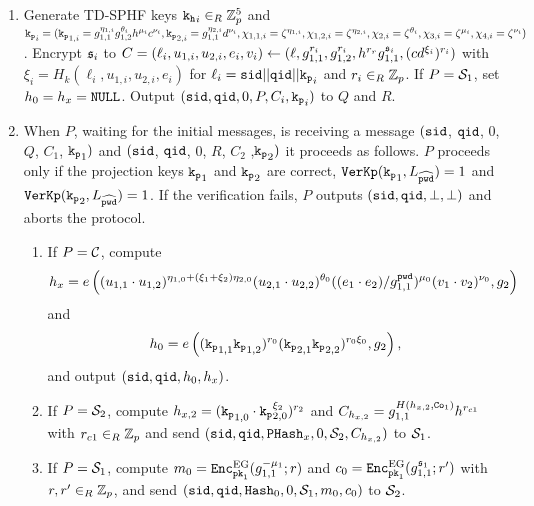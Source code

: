 	
	  \begin{enumerate}
	    \item Generate \ac{TD-SPHF} keys $\mathtt{k_h}_i\in_R\mathbb{Z}_p^{5}$ and 
	      $\mathtt{k_p}_i=(\mathtt{k_p}_{1,i}=g_{1,1}^{\eta_{1,i}} g_{1,2}^{\theta_i} h^{\mu_i} c^{\nu_i}, \mathtt{k_p}_{2,i}=g_{1,1}^{\eta_{2,i}} d^{\nu_i}, \chi_{1,1,i}={\zeta}^{\eta_{1,i}}, \chi_{1,2,i}={\zeta}^{\eta_{2,i}}, \chi_{2,i}={\zeta}^{\theta_i}, \chi_{3,i}={\zeta}^{\mu_i}, \chi_{4,i}={\zeta}^{\nu_i})$. 
	    Encrypt $\mathfrak{s}_i$ to $C=(\ell_i,u_{1,i},u_{2,i},e_i,v_i)\gets(\ell, g_{1,1}^{r_i}, g_{1,2}^{r_i}, h^{r_r} g_{1,1}^{\mathfrak{s}_i}, (cd^{\xi_i})^{r_i})$ with $\xi_i=H_k(\ell_i, u_{1,i}, u_{2,i}, e_i)$ for $\ell_i=\mathtt{sid} || \mathtt{qid} || \mathtt{k_p}_i$ and $r_i\in_R\mathbb{Z}_p$.
	    If $P=\mathcal{S}_1$, set $h_0=h_x=\mathtt{NULL}$.
	    Output $(\mathtt{sid},\mathtt{qid},0,P,C_i,\mathtt{k_p}_i)$ to $Q$ and $R$.
	    
	    \item When $P$, waiting for the initial messages, is receiving a message $(\mathtt{sid}$, $\mathtt{qid}$, $0$, $Q$, $C_1$, $\mathtt{k_p}_1)$ and $(\mathtt{sid}$, $\mathtt{qid}$, $0$, $R$, $C_2$ ,$\mathtt{k_p}_2)$ it proceeds as follows.
	      $P$ proceeds only if the projection keys $\mathtt{k_p}_1$ and $\mathtt{k_p}_2$ are correct, \ie $\mathtt{VerKp}(\mathtt{k_p}_1, L_{\widehat{\mathtt{pwd}}})=1$ and $\mathtt{VerKp}(\mathtt{k_p}_2, L_{\widehat{\mathtt{pwd}}})=1$.
	          If the verification fails, $P$ outputs $(\mathtt{sid}, \mathtt{qid}, \bot, \bot)$ and aborts the protocol.
	      \begin{enumerate}
	        \item If $P=\mathcal{C}$, compute \\
	          \[h_x=e\left((u_{1,1}\cdot u_{1,2})^{\eta_{1,0}+(\xi_1+\xi_2)\eta_{2,0}} (u_{2,1}\cdot u_{2,2})^{\theta_0} ((e_1\cdot e_2)/g_{1,1}^{\mathtt{pwd}})^{\mu_0} (v_1\cdot v_2)^{\nu_0}, g_2\right) \] 
	          and \\
	          \[ h_0=e\left( (\mathtt{k_p}_{1,1}\mathtt{k_p}_{1,2})^{r_0} (\mathtt{k_p}_{2,1}\mathtt{k_p}_{2,2})^{r_0\xi_0}, g_2 \right),\]
	          and output $(\mathtt{sid}, \mathtt{qid}, h_0, h_x)$.
	        \item If $P=\mathcal{S}_2$, compute
	          $h_{x,2} = (\mathtt{k_p}_{1,0} \cdot \mathtt{k_p}_{2,0}^{\xi_2})^{r_2}$ and 
	          $C_{h_{x,2}}=g_{1,1}^{H(h_{x,2}, \mathtt{Co}_{1})} h^{r_{c1}}$ with $r_{c1}\in_R\mathbb{Z}_p$
	          and send $(\mathtt{sid},\mathtt{qid},\mathtt{PHash}_x,0,\mathcal{S}_2,C_{h_{x,2}})$ to $\mathcal{S}_1$.
	        \item If $P=\mathcal{S}_1$, compute
	          $m_{0} = \mathtt{Enc}_{\mathtt{pk}_1}^\mathrm{EG}(g_{1,1}^{-\mu_1}; r)$ and
	          $c_{0} = \mathtt{Enc}_{\mathtt{pk}_1}^\mathrm{EG}(g_{1,1}^{\mathfrak{s}_1}; r')$
	          with $r,r'\in_R\mathbb{Z}_p$, and send $(\mathtt{sid},\mathtt{qid},\mathtt{Hash}_0,0,\mathcal{S}_1,m_0,c_0)$ to $\mathcal{S}_2$.
	      \end{enumerate}
	      

\end{enumerate}
